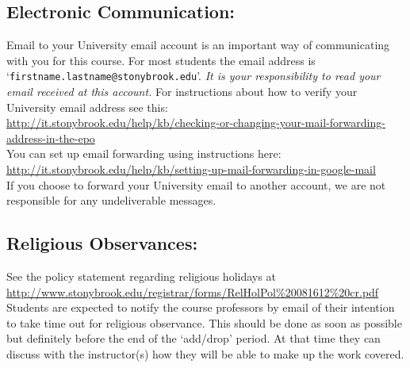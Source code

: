 \documentclass[11pt]{article}
\begin{document}
\subsection*{Electronic Communication: }

\noindent Email to your University email account is an important way
of communicating with you for this course.  For most students the
email address is `{\tt firstname.lastname@stonybrook.edu}'.
{\em It is your responsibility to read your email received at this
  account.}  For instructions about how to verify your University
email address see this: \\[0.25em]
\url{http://it.stonybrook.edu/help/kb/checking-or-changing-your-mail-forwarding-address-in-the-epo}
\\[0.25em]
%
You can set up email forwarding using instructions here: \\[0.25em]
\url{http://it.stonybrook.edu/help/kb/setting-up-mail-forwarding-in-google-mail}
\\[0.25em]
%
If you choose to forward your University email to another account, we
are not responsible for any undeliverable messages.

\subsection*{Religious Observances: }

\noindent See the policy statement regarding religious holidays at
\\[0.25em] {
  \url{http://www.stonybrook.edu/registrar/forms/RelHolPol\%20081612\%20cr.pdf}}
\\[0.25em]
%
Students are expected to notify the course professors by email of
their intention to take time out for religious observance.  This
should be done as soon as possible but definitely before the end of
the `add/drop' period.  At that time they can discuss with the
instructor(s) how they will be able to make up the work covered.
\end{document}
